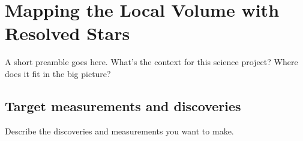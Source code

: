 %
%
%
%
%
%
%

\section{Mapping the Local Volume with Resolved Stars}
\def\secname{MW_LocalVolume}\label{sec:\secname} %



A short preamble goes here. What's the context for this science
project? Where does it fit in the big picture?


\subsection{Target measurements and discoveries}
\label{sec:keyword:MW_LocalVolume_targets}

Describe the discoveries and measurements you want to make.


